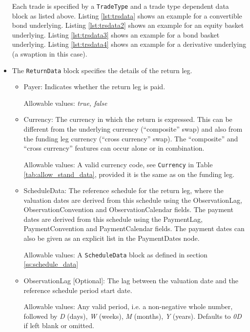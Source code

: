 \begin{itemize}
\begin{itemize}
  \end{itemize}

  Each trade is specified by a \verb+TradeType+ and a trade type dependent data block as listed above. Listing
  \ref{lst:trsdata} shows an example for a convertible bond underlying. Listing \ref{lst:trsdata2} shows an example for
  an equity basket underlying. Listing \ref{lst:trsdata3} shows an example for a bond basket underlying. Listing
  \ref{lst:trsdata4} shows an example for a derivative underlying (a swaption in this case).

\item The {\tt ReturnData} block specifies the details of the return leg.
  \begin{itemize}
  \item Payer: Indicates whether the return leg is paid.
  
    Allowable values: \emph{true, false}
    
  \item Currency: The currency in which the return is expressed. This can be different from the underlying currency
    (``composite'' swap) and also from the funding leg currency (``cross currency'' swap). The ``composite'' and ``cross
    currency'' features can occur alone or in combination.
    
    Allowable values: A valid currency code, see \lstinline!Currency! in Table \ref{tab:allow_stand_data}, provided it is the same as on the funding leg.
    
  \item ScheduleData: The reference schedule for the return leg, where the valuation dates are derived from this schedule
    using the ObservationLag, ObservationConvention and ObservationCalendar fields. The payment dates are derived from
    this schedule using the PaymentLag, PaymentConvention and PaymentCalendar fields. The payment dates can also be
    given as an explicit list in the PaymentDates node.
    
    Allowable values: A \lstinline!ScheduleData! block as defined in section \ref{ss:schedule_data}
    
  \item ObservationLag [Optional]: The lag between the valuation date and the reference schedule period start date.
  
    Allowable values: Any valid period, i.e. a non-negative whole number, followed by \emph{D} (days), \emph{W} (weeks), \emph{M} (months), \emph{Y} (years). Defaults to \emph{0D} if left blank or omitted.
    

\end{itemize}
\end{itemize}
